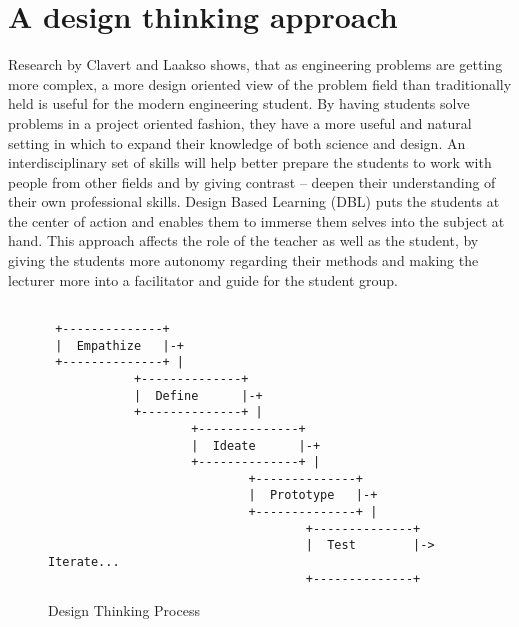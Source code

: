 \documentclass[english,12pt,a4paper,dvips]{article}
\begin{document}

\clearpage

\section{A design thinking approach}

Research by Clavert and Laakso \cite{Clavert} shows, that as engineering problems are getting more complex, a more design oriented view of the problem field than traditionally held is useful for the modern engineering student. By having students solve problems in a project oriented fashion, they have a more useful and natural setting in which to expand their knowledge of both science and design. An interdisciplinary set of skills will help better prepare the students to work with people from other fields and by giving contrast -- deepen their understanding of their own professional skills. Design Based Learning (DBL) puts the students at the center of action and enables them to immerse them selves into the subject at hand. This approach affects the role of the teacher as well as the student, by giving the students more autonomy regarding their methods and making the lecturer more into a facilitator and guide for the student group.

\begin{figure}
\begin{verbatim}
 
 +--------------+
 |  Empathize   |-+
 +--------------+ |
            +--------------+
            |  Define      |-+
            +--------------+ |
                    +--------------+
                    |  Ideate      |-+
                    +--------------+ |
                            +--------------+
                            |  Prototype   |-+
                            +--------------+ |
                                    +--------------+
                                    |  Test        |-> Iterate...
                                    +--------------+
\end{verbatim}
\caption{Design Thinking Process}
\label{fig:dt-process}
\end{figure}
\end{document}
